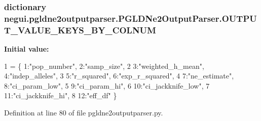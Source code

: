 \subsubsection[{\texorpdfstring{O\+U\+T\+P\+U\+T\+\_\+\+V\+A\+L\+U\+E\+\_\+\+K\+E\+Y\+S\+\_\+\+B\+Y\+\_\+\+C\+O\+L\+N\+UM}{OUTPUT_VALUE_KEYS_BY_COLNUM}}]{\setlength{\rightskip}{0pt plus 5cm}dictionary negui.\+pgldne2outputparser.\+P\+G\+L\+D\+Ne2\+Output\+Parser.\+O\+U\+T\+P\+U\+T\+\_\+\+V\+A\+L\+U\+E\+\_\+\+K\+E\+Y\+S\+\_\+\+B\+Y\+\_\+\+C\+O\+L\+N\+UM\hspace{0.3cm}{\ttfamily [static]}}\hypertarget{classnegui_1_1pgldne2outputparser_1_1PGLDNe2OutputParser_a0baccc5dddbc92021e194500cd4f823e}{}\label{classnegui_1_1pgldne2outputparser_1_1PGLDNe2OutputParser_a0baccc5dddbc92021e194500cd4f823e}
{\bfseries Initial value\+:}
\begin{DoxyCode}
1 = \{ 1:\textcolor{stringliteral}{"pop\_number"}, 2:\textcolor{stringliteral}{"samp\_size"}, 
2                                     3:\textcolor{stringliteral}{"weighted\_h\_mean"}, 4:\textcolor{stringliteral}{"indep\_alleles"}, 
3                                     5:\textcolor{stringliteral}{"r\_squared"}, 6:\textcolor{stringliteral}{"exp\_r\_squared"}, 
4                                     7:\textcolor{stringliteral}{"ne\_estimate"}, 8:\textcolor{stringliteral}{"ci\_param\_low"}, 
5                                     9:\textcolor{stringliteral}{"ci\_param\_hi"}, 
6                                     10:\textcolor{stringliteral}{"ci\_jackknife\_low"}, 
7                                     11:\textcolor{stringliteral}{"ci\_jackknife\_hi"}, 
8                                     12:\textcolor{stringliteral}{"eff\_df"} \}
\end{DoxyCode}


Definition at line 80 of file pgldne2outputparser.\+py.

